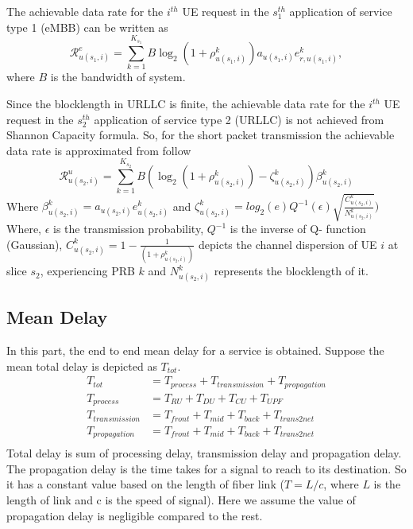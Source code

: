 \documentclass[conference]{IEEEtran}
\begin{document}
The achievable data rate for the $i^{th}$ UE request in the $s_{1}^{th}$ application of service type 1 (eMBB) can be written as
\begin{equation}\label{eq1}
\mathcal{R}_{u(s_1,i)}^{e} = \sum_{k=1}^{K_{s_1}} B \log_2({1+ \rho_{u(s_1,i)}^{k}})a_{u(s_1,i)} e^k_{r,u(s_1,i)},
\end{equation}
where $B$ is the bandwidth of system. 

Since the blocklength in URLLC is finite, the achievable data rate for the $i^{th}$ UE request in the $s_{2}^{th}$ application of service type 2 (URLLC) is not achieved from Shannon Capacity formula. So, for the short packet transmission the achievable data rate is approximated from follow
\begin{equation}\label{eq1}
\mathcal{R}_{u(s_2,i)}^{u} = \sum_{k=1}^{K_{s_2}} B (\log_2({1+ \rho_{u(s_2,i)}^{k}})- \zeta_{u(s_2,i)}^{k}){\beta}_{u(s_2,i)}^{k}
\end{equation}
Where ${\beta}_{u(s_2,i)}^{k}=a_{u(s_2,i)} e^{k}_{u(s_2,i)}$
and $\zeta_{u(s_2,i)}^{k} = log_2({e})Q^{-1}(\epsilon) \sqrt{\frac{C_{u(s_2,i)}^{k}}{N_{u(s_2,i)}^{k}}})$
Where, $\epsilon $ is the transmission probability, $Q^{-1}$ is the inverse of Q- function (Gaussian),
$C_{u(s_2,i)}^{k} = 1 - \frac{1}{(1+\rho_{u(s_2,i)}^{k})}$ depicts the channel dispersion of UE  $i$ at slice $s_2$, experiencing PRB $k$ and
$N_{u(s_2,i)}^{k}$ represents the blocklength of it. 

\subsection{Mean Delay}
In this part, the end to end mean delay for a service is obtained.
Suppose the mean total delay is depicted as $T_{tot}$.
\begin{equation}
\begin{split}
T_{tot} &=  T_{process} + T_{transmission} + T_{propagation}\\
T_{process} &=  T_{RU} + T_{DU} + T_{CU} + T_{UPF}\\
T_{transmission} &= T_{front} + T_{mid} + T_{back} + T_{trans2net} \\
T_{propagation} &= T_{front} + T_{mid} + T_{back} + T_{trans2net} \\
\end{split}
\end{equation}
Total delay is sum of processing delay, transmission delay and propagation delay. 
The propagation delay is the time takes for a signal to reach to its destination. So it has a constant value based on the length of fiber link ($T = L/c$, where $L$ is the length of link and c is the speed of signal).
Here we assume the value of propagation delay is negligible compared to the rest.
\end{document}
